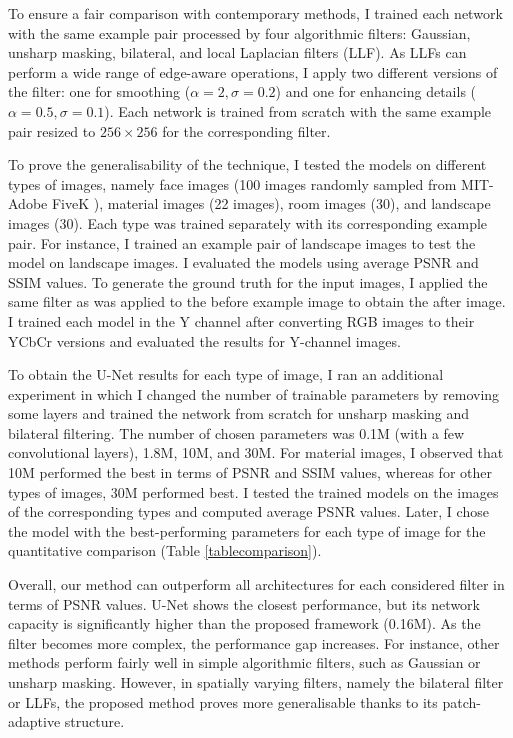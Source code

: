 To ensure a fair comparison with contemporary methods, I trained each network with the same example pair processed by four algorithmic filters: Gaussian, unsharp masking, bilateral, and local Laplacian filters (\gls{LLF}). As \gls{LLF}s can perform a wide range of edge-aware operations, I apply two different versions of the filter: one for smoothing ($\alpha=2, \sigma=0.2$) and one for enhancing details ($\alpha=0.5, \sigma=0.1$). Each network is trained from scratch with the same example pair resized to $256 \times 256$ for the corresponding filter.

To prove the generalisability of the technique, I tested the models on different types of images, namely face images (100 images randomly sampled from MIT-Adobe FiveK \cite{Bychkovsky11Learning}), material images (22 images), room images (30), and landscape images (30). Each type was trained separately with its corresponding example pair. For instance, I trained an example pair of landscape images to test the model on landscape images. I evaluated the models using average \gls{PSNR} and \gls{SSIM} values. To generate the ground truth for the input images, I applied the same filter as was applied to the before example image to obtain the after image. I trained each model in the Y channel after converting RGB images to their YCbCr versions and evaluated the results for Y-channel images.

To obtain the U-Net results for each type of image, I ran an additional experiment in which I changed the number of trainable parameters by removing some layers and trained the network from scratch for unsharp masking and bilateral filtering. The number of chosen parameters was 0.1M (with a few convolutional layers), 1.8M, 10M, and 30M. For material images, I observed that 10M performed the best in terms of \gls{PSNR} and \gls{SSIM} values, whereas for other types of images, 30M performed best. I tested the trained models on the images of the corresponding types and computed average \gls{PSNR} values. Later, I chose the model with the best-performing parameters for each type of image for the quantitative comparison (Table \ref{tablecomparison}).

Overall, our method can outperform all architectures for each considered filter in terms of \gls{PSNR} values. U-Net shows the closest performance, but its network capacity is significantly higher than the proposed framework (0.16M). As the filter becomes more complex, the performance gap increases. For instance, other methods perform fairly well in simple algorithmic filters, such as Gaussian or unsharp masking. However, in spatially varying filters, namely the bilateral filter or \gls{LLF}s, the proposed method proves more generalisable thanks to its patch-adaptive structure.

